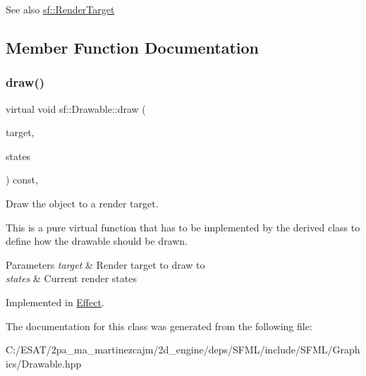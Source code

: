 \begin{DoxySeeAlso}{See also}
\hyperlink{classsf_1_1_render_target}{sf\+::\+Render\+Target} 
\end{DoxySeeAlso}


\subsection{Member Function Documentation}
\mbox{\label{classsf_1_1_drawable_a90d2c88bba9b035a0844eccb380ef631}} 
\subsubsection{\texorpdfstring{draw()}{draw()}}
{\footnotesize\ttfamily virtual void sf\+::\+Drawable\+::draw (\begin{DoxyParamCaption}\item[{\hyperlink{classsf_1_1_render_target}{Render\+Target} \&}]{target,  }\item[{\hyperlink{classsf_1_1_render_states}{Render\+States}}]{states }\end{DoxyParamCaption}) const\hspace{0.3cm}{\ttfamily [protected]}, {}}



Draw the object to a render target. 

This is a pure virtual function that has to be implemented by the derived class to define how the drawable should be drawn.


\begin{DoxyParams}{Parameters}
{\em target} & Render target to draw to \\
\hline
{\em states} & Current render states \\
\hline
\end{DoxyParams}


Implemented in \hyperlink{class_effect_a6a3a393e127581c7f84e1278b5be0438}{Effect}.



The documentation for this class was generated from the following file\+:\begin{DoxyCompactItemize}
\item 
C\+:/\+E\+S\+A\+T/2pa\+\_\+ma\+\_\+martinezcajm/2d\+\_\+engine/deps/\+S\+F\+M\+L/include/\+S\+F\+M\+L/\+Graphics/Drawable.\+hpp\end{DoxyCompactItemize}
